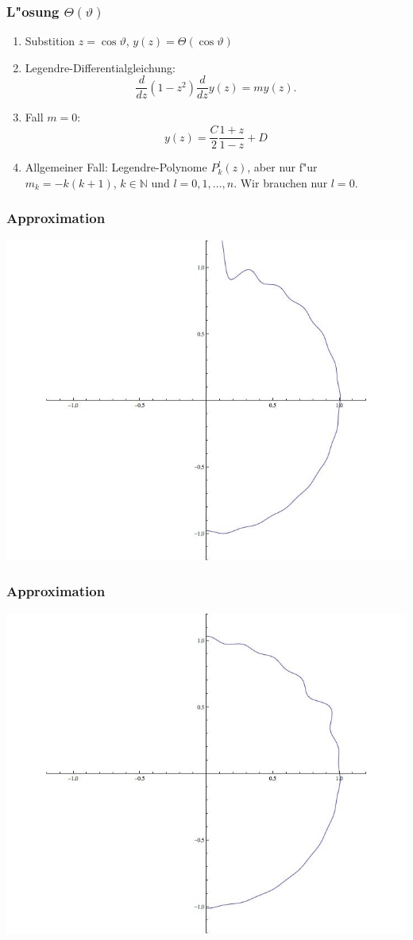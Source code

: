 \documentclass{beamer}
\begin{document}
\begin{frame}
\frametitle{L"osung $\Theta(\vartheta)$}
\begin{enumerate}
\item Substition $z=\cos\vartheta$, $y(z)=\Theta(\cos\vartheta)$
\item Legendre-Differentialgleichung:
\[
\frac{d}{dz}(1-z^2)\frac{d}{dz}y(z) =my(z).
\]
\item Fall $m=0$:
\[
y(z)=\frac{C}2\frac{1+z}{1-z}+D
\]
\item Allgemeiner Fall: Legendre-Polynome $P_k^l(z)$, aber nur
f"ur $m_k=-k(k+1)$, $k\in\mathbb N$ und $l=0,1,\dots,n$.
Wir brauchen nur $l=0$.
\end{enumerate}
\end{frame}

\begin{frame}
\frametitle{Approximation}
\begin{center}
\includegraphics[width=0.9\hsize]{../../skript/graphics/tsunami0.jpg}
\end{center}
\end{frame}

\begin{frame}
\frametitle{Approximation}
\begin{center}
\includegraphics[width=0.9\hsize]{../../skript/graphics/tsunami50.jpg}
\end{center}
\end{frame}
\end{document}
